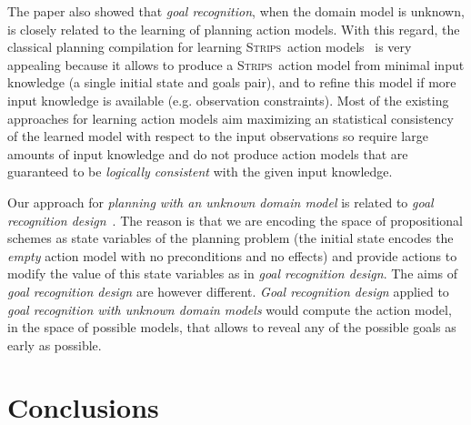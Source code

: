 \documentclass{article}
\newcommand{\strips}{\textsc{Strips}}
\begin{document}
The paper also showed that {\em goal recognition}, when the domain model is unknown, is closely related to the learning of planning action models. With this regard, the classical planning compilation for learning \strips\ action models~\cite{aineto2018learning} is very appealing because it allows to produce a \strips\ action model from minimal input knowledge (a single initial state and goals pair), and to refine this model if more input knowledge is available (e.g. observation constraints). Most of the existing approaches for learning action models aim maximizing an statistical consistency of the learned model with respect to the input observations so require large amounts of input knowledge and do not produce action models that are guaranteed to be {\em logically consistent} with the given input knowledge.

Our approach for {\em planning with an unknown domain model} is related to {\em goal recognition design}~\cite{KerenGK14}. The reason is that we are encoding the space of propositional schemes as state variables of the planning problem (the initial state encodes the {\em empty} action model with no preconditions and no effects) and provide actions to modify the value of this state variables as in {\em goal recognition design}. The aims of {\em goal recognition design} are however different. {\em Goal recognition design} applied to {\em goal recognition with unknown domain models} would compute the action model, in the space of possible models, that allows to reveal any of the possible goals as early as possible.


\section{Conclusions}
\label{sec:conclusions}




\end{document}
